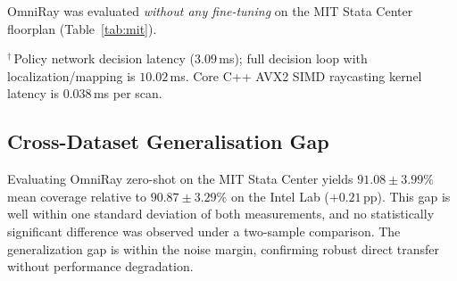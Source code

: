 \documentclass[conference]{IEEEtran}
\begin{document}
OmniRay was evaluated \textit{without any fine-tuning} on the MIT Stata Center floorplan (Table~\ref{tab:mit}).

\begin{table}[t]
\caption{Zero-Shot Benchmark --- MIT Stata Center (Mean $\pm$ SD)}
\label{tab:mit}
\centering
{}
\vspace{1pt}
{\raggedright\footnotesize $^\dagger$\,Policy network decision latency ($3.09$\,ms); full decision loop with localization/mapping is $10.02$\,ms. Core C++ AVX2 SIMD raycasting kernel latency is $0.038$\,ms per scan.\par}
\end{table}

\subsection{Cross-Dataset Generalisation Gap}
Evaluating OmniRay zero-shot on the MIT Stata Center yields $91.08 \pm 3.99\%$ mean coverage relative to $90.87 \pm 3.29\%$ on the Intel Lab ($+0.21$\,pp). This gap is well within one standard deviation of both measurements, and no statistically significant difference was observed under a two-sample comparison. The generalization gap is within the noise margin, confirming robust direct transfer without performance degradation.
\end{document}
